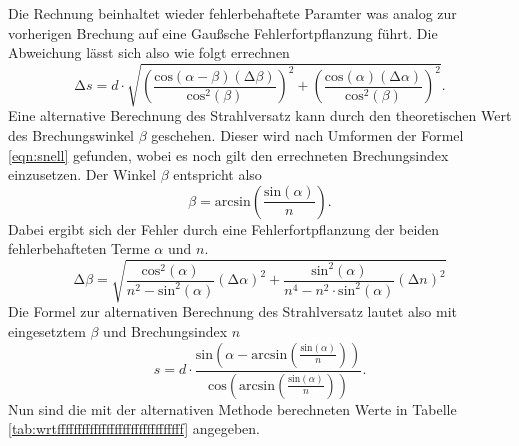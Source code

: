 Die Rechnung beinhaltet wieder fehlerbehaftete Paramter was analog zur vorherigen Brechung auf eine Gaußsche Fehlerfortpflanzung 
führt. Die Abweichung lässt sich also wie folgt errechnen
\begin{equation}
\increment s = d \cdot \sqrt{\left( \frac{\text{cos}(\alpha - \beta) (\increment \beta)}{\text{cos}^2(\beta)}\right)^2 + \left( \frac{\text{cos}(\alpha) (\increment \alpha)}{\text{cos}^2(\beta)}\right)^2}.
\end{equation}
Eine alternative Berechnung des Strahlversatz kann durch den theoretischen Wert des Brechungswinkel $\beta$ geschehen. 
Dieser wird nach Umformen der Formel \eqref{eqn:snell} gefunden, wobei es noch gilt den errechneten Brechungsindex
einzusetzen. Der Winkel $\beta$ entspricht also
\begin{equation}
    \label{eqn:yowhatever}
    \beta  = \text{arcsin} \left( \frac{\text{sin}(\alpha)}{n}\right).
\end{equation}
Dabei ergibt sich der Fehler durch eine Fehlerfortpflanzung der beiden fehlerbehafteten Terme $\alpha$ und $n$.
\begin{equation}
\increment \beta = \sqrt{\frac{\text{cos}^2(\alpha)}{n^2 - \text{sin}^2(\alpha)} (\increment \alpha)^2 + \frac{\text{sin}^2(\alpha)}{n^4 - n^2 \cdot \text{sin}^2(\alpha)} (\increment n)^2  }
\end{equation}
Die Formel zur alternativen Berechnung des Strahlversatz lautet also mit eingesetztem $\beta$ und Brechungsindex $n$
\begin{equation*}
    s = d  \cdot \frac{\text{sin} \left (  \alpha- \text{arcsin} \left( \frac{\text{sin}(\alpha)}{n}\right) \right)} {\text{cos}\left(\text{arcsin} \left( \frac{\text{sin}(\alpha)}{n}\right)\right)}.
\end{equation*}
Nun sind die mit der alternativen Methode berechneten Werte in Tabelle \ref{tab:wrtfffffffffffffffffffffffffffffff} angegeben.
